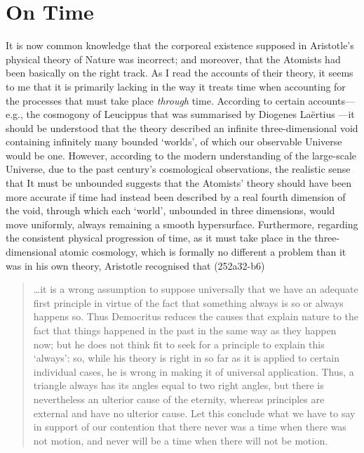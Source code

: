 \section{On Time\label{sec_OT}}
It is now common knowledge that the corporeal existence supposed in Aristotle's physical theory of Nature was incorrect; and moreover, that the Atomists had been basically on the right track. As I read the accounts of their theory, it seems to me that it is primarily lacking in the way it treats time when accounting for the processes that must take place \textit{through} time. According to certain accounts---e.g., the cosmogony of Leucippus that was summarised by Diogenes La\"{e}rtius \cite{Diogenes1931}---it should be understood that the theory described an infinite three-dimensional void containing infinitely many bounded `worlds', of which our observable Universe would be one. However, according to the modern understanding of the large-scale Universe, due to the past century's cosmological observations, the realistic sense that It must be unbounded suggests that the Atomists' theory should have been more accurate if time had instead been described by a real fourth dimension of the void, through which each `world', unbounded in three dimensions, would move uniformly, always remaining a smooth hypersurface. Furthermore, regarding the consistent physical progression of time, as it must take place in the three-dimensional atomic cosmology, which is formally no different a problem than it was in his own theory, Aristotle recognised that \cite{Aristotle1984} (252a32-b6)
\begin{quote}
\ldots it is a wrong assumption to suppose universally that we have an adequate first principle in virtue of the fact that something always is so or always happens so. Thus Democritus reduces the causes that explain nature to the fact that things happened in the past in the same way as they happen now; but he does not think fit to seek for a principle to explain this `always': so, while his theory is right in so far as it is applied to certain individual cases, he is wrong in making it of universal application. Thus, a triangle always has its angles equal to two right angles, but there is nevertheless an ulterior cause of the eternity, whereas principles are external and have no ulterior cause. Let this conclude what we have to say in support of our contention that there never was a time when there was not motion, and never will be a time when there will not be motion.
\end{quote}
